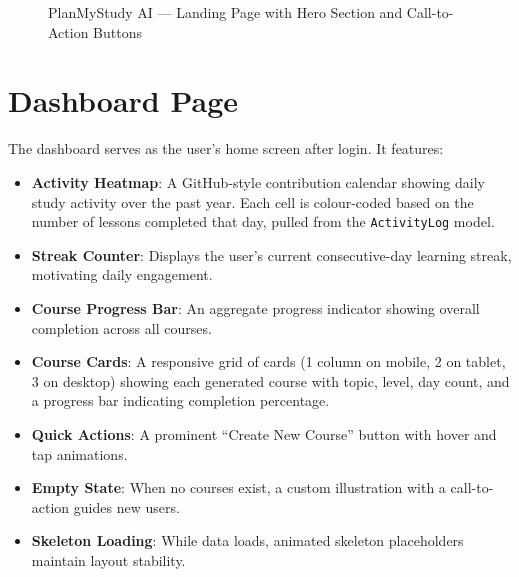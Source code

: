 \documentclass[12pt,a4paper]{report}
\begin{document}
\begin{figure}[H]
    \centering
    \caption{PlanMyStudy AI --- Landing Page with Hero Section and Call-to-Action Buttons}
    \label{fig:landing}
\end{figure}

\section{Dashboard Page}
The dashboard serves as the user's home screen after login. It features:

\begin{itemize}[noitemsep]
    \item \textbf{Activity Heatmap}: A GitHub-style contribution calendar showing daily study activity over the past year. Each cell is colour-coded based on the number of lessons completed that day, pulled from the \texttt{ActivityLog} model.
    \item \textbf{Streak Counter}: Displays the user's current consecutive-day learning streak, motivating daily engagement.
    \item \textbf{Course Progress Bar}: An aggregate progress indicator showing overall completion across all courses.
    \item \textbf{Course Cards}: A responsive grid of cards (1 column on mobile, 2 on tablet, 3 on desktop) showing each generated course with topic, level, day count, and a progress bar indicating completion percentage.
    \item \textbf{Quick Actions}: A prominent ``Create New Course'' button with hover and tap animations.
    \item \textbf{Empty State}: When no courses exist, a custom illustration with a call-to-action guides new users.
    \item \textbf{Skeleton Loading}: While data loads, animated skeleton placeholders maintain layout stability.
\end{itemize}
\end{document}
